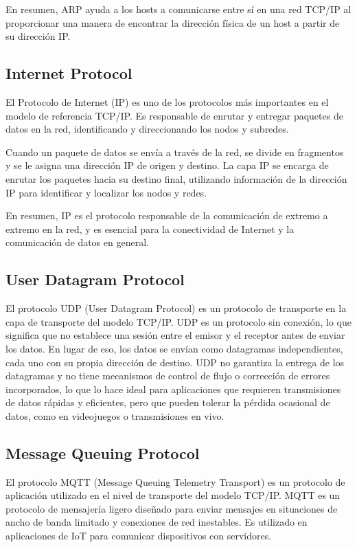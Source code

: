 En resumen, ARP ayuda a los hosts a comunicarse entre sí en una red TCP/IP al proporcionar una manera de encontrar la dirección física de un host a partir de su dirección IP.


\subsection{Internet Protocol}

El Protocolo de Internet (IP) es uno de los protocolos más importantes en el modelo de referencia TCP/IP. Es responsable de enrutar y entregar paquetes de datos en la red, identificando y direccionando los nodos y subredes.

Cuando un paquete de datos se envía a través de la red, se divide en fragmentos y se le asigna una dirección IP de origen y destino. La capa IP se encarga de enrutar los paquetes hacia su destino final, utilizando información de la dirección IP para identificar y localizar los nodos y redes.

En resumen, IP es el protocolo responsable de la comunicación de extremo a extremo en la red, y es esencial para la conectividad de Internet y la comunicación de datos en general.


\subsection{User Datagram Protocol}

El protocolo UDP (User Datagram Protocol) es un protocolo de transporte en la capa de transporte del modelo TCP/IP. UDP es un protocolo sin conexión, lo que significa que no establece una sesión entre el emisor y el receptor antes de enviar los datos. En lugar de eso, los datos se envían como datagramas independientes, cada uno con su propia dirección de destino. UDP no garantiza la entrega de los datagramas y no tiene mecanismos de control de flujo o corrección de errores incorporados, lo que lo hace ideal para aplicaciones que requieren transmisiones de datos rápidas y eficientes, pero que pueden tolerar la pérdida ocasional de datos, como en videojuegos o transmisiones en vivo.


\subsection{Message Queuing Protocol}

El protocolo MQTT (Message Queuing Telemetry Transport) es un protocolo de aplicación utilizado en el nivel de transporte del modelo TCP/IP. MQTT es un protocolo de mensajería ligero diseñado para enviar mensajes en situaciones de ancho de banda limitado y conexiones de red inestables. Es utilizado en aplicaciones de IoT para comunicar dispositivos con servidores.

